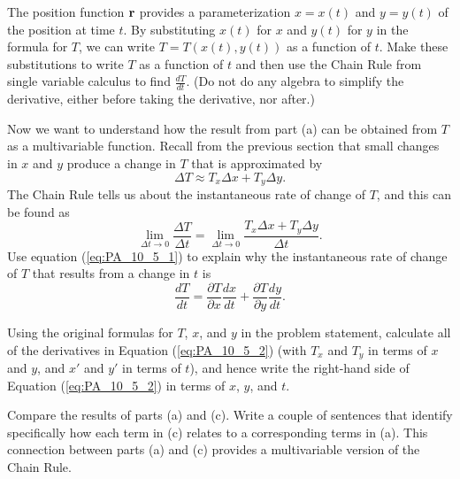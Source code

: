 \begin{pa}
  \ba
\item The position function $\mathbf{r}$ provides a parameterization $x = x(t)$ and $y = y(t)$ of the position at time $t$. By substituting $x(t)$ for $x$ and $y(t)$ for $y$ in the formula for $T$, we can write $T = T(x(t), y(t))$ as a function of $t$. Make these substitutions to write $T$ as a function of $t$ and then use the Chain Rule from single variable calculus to find $\frac{dT}{dt}$. (Do not do any algebra to simplify the derivative, either before taking the derivative, nor after.)
\item Now we want to understand how the result from part (a) can be obtained from $T$ as a multivariable function.  Recall from the previous section that small changes in $x$ and $y$ produce a change in $T$ that is approximated by 
\[\Delta T \approx  T_x\Delta x + T_y\Delta y.\]
The Chain Rule tells us about the instantaneous rate of change of $T$, and this can be found as  
\begin{equation} \label{eq:PA_10_5_1}
\lim_{\Delta t \to 0} \frac{\Delta T}{\Delta t} = \lim_{\Delta t \to 0} \frac{T_x \Delta x + T_y \Delta y}{\Delta t}.
\end{equation}
Use equation (\ref{eq:PA_10_5_1}) to explain why the instantaneous rate of change of $T$ that results from a change in $t$ is 
\begin{equation} \label{eq:PA_10_5_2}
\frac{dT}{dt} = \frac{\partial T}{\partial x} \frac{dx}{dt} + \frac{\partial T}{\partial y} \frac{dy}{dt}.
\end{equation} 
	\item  Using the original formulas for $T$, $x$, and $y$ in the problem statement, calculate all of the derivatives in Equation (\ref{eq:PA_10_5_2}) (with $T_x$ and $T_y$ in terms of $x$ and $y$, and $x'$ and $y'$ in terms of $t$), and hence write the right-hand side of Equation (\ref{eq:PA_10_5_2}) in terms of $x$, $y$, and $t$. 
	\item Compare the results of parts (a) and (c). Write a couple of sentences that identify specifically how each term in (c) relates to a corresponding terms in  (a). This connection between parts (a) and (c) provides a multivariable version of the Chain Rule. 
  \ea

\end{pa} 

